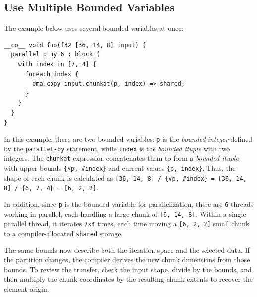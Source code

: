 \subsection*{Use Multiple Bounded Variables}

The example below uses several bounded variables at once:

\begin{lstlisting}[language=croqtile,caption={Use Multiple Bounded Variables}]
__co__ void foo(f32 [36, 14, 8] input) {
  parallel p by 6 : block {
    with index in [7, 4] {
      foreach index {
        dma.copy input.chunkat(p, index) => shared;
      }
    }
  }
}
\end{lstlisting}

In this example, there are two bounded variables: \texttt{p} is the \emph{bounded integer} defined by the \texttt{parallel-by} statement, while \texttt{index} is the \emph{bounded ituple} with two integers. The \texttt{chunkat} expression concatenates them to form a \emph{bounded ituple} with upper-bounds \texttt{\{\#\allowbreak{}p, \#\allowbreak{}index\}} and current values \texttt{\{p, index\}}. Thus, the shape of each chunk is calculated as \texttt{[36, 14, 8] /\allowbreak{} \{\#\allowbreak{}p, \#\allowbreak{}index\} = [36, 14, 8] /\allowbreak{} \{6, 7, 4\} = [6, 2, 2]}.

In addition, since \texttt{p} is the bounded variable for parallelization, there are \texttt{6} threads working in parallel, each handling a large chunk of \texttt{[6, 14, 8]}. Within a single parallel thread, it iterates \texttt{7x4} times, each time moving a \texttt{[6, 2, 2]} small chunk to a compiler-allocated \texttt{shared} storage.

The same bounds now describe both the iteration space and the selected data. If the partition changes, the compiler derives the new chunk dimensions from those bounds. To review the transfer, check the input shape, divide by the bounds, and then multiply the chunk coordinates by the resulting chunk extents to recover the element origin.
